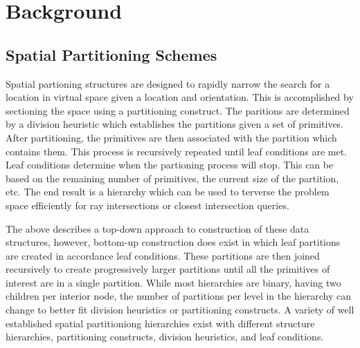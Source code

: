 \documentclass[12pt, a4paper]{article}
\begin{document}
\section{Background}%
\label{background}

\subsection{Spatial Partitioning Schemes}%

Spatial partioning structures are designed to rapidly narrow the search for a location in virtual space given a location and orientation. This is accomplished by sectioning the space using a partitioning construct. The paritions are determined by a division heuristic which establishes the partitions given a set of primitives. After partitioning, the primitives are then associated with the partition which contains them. This process is recursively repeated until leaf conditions are met. Leaf conditions determine when the partioning process will stop. This can be based on the remaining number of primitives, the current size of the partition, etc. The end result is a hierarchy which can be used to terverse the problem space efficiently for ray intersections or closest intersection queries. 

The above describes a top-down approach to construction of these data structures, however, bottom-up construction does exist in which leaf partitions are created in accordance leaf conditions. These partitions are then joined recursively to create progressively larger partitions until all the primitives of interest are in a single partition. While most hierarchies are binary, having two children per interior node, the number of partitions per level in the hierarchy can change to better fit division heuristics or partitioning constructs. A variety of well established spatial partitioniong hierarchies exist with different structure hierarchies, partitioning constructs, division heuristics, and leaf conditions.

 
\end{document}
